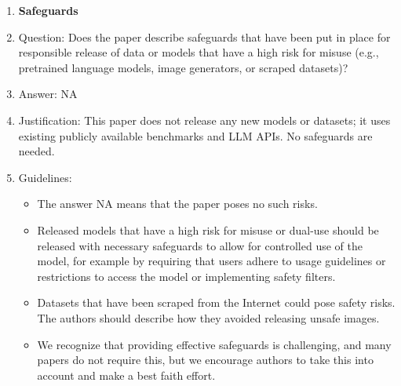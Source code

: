 \documentclass{article}
\newcommand{\answerNA}[1][]{NA}
\begin{document}
\begin{enumerate}
\item {\bf Safeguards}
    \item[] Question: Does the paper describe safeguards that have been put in place for responsible release of data or models that have a high risk for misuse (e.g., pretrained language models, image generators, or scraped datasets)?
    \item[] Answer: \answerNA{}
    \item[] Justification: This paper does not release any new models or datasets; it uses existing publicly available benchmarks and LLM APIs. No safeguards are needed.
    \item[] Guidelines:
    \begin{itemize}
        \item The answer NA means that the paper poses no such risks.
        \item Released models that have a high risk for misuse or dual-use should be released with necessary safeguards to allow for controlled use of the model, for example by requiring that users adhere to usage guidelines or restrictions to access the model or implementing safety filters. 
        \item Datasets that have been scraped from the Internet could pose safety risks. The authors should describe how they avoided releasing unsafe images.
        \item We recognize that providing effective safeguards is challenging, and many papers do not require this, but we encourage authors to take this into account and make a best faith effort.
    \end{itemize}


\end{enumerate}
\end{document}
